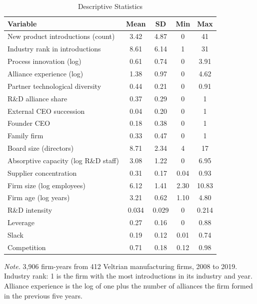 \documentclass[12pt]{article}
\begin{document}
\clearpage
\begin{table}[p]
\centering\small
\caption{Descriptive Statistics}
\begin{tabular}{lcccc}
\toprule
Variable & Mean & SD & Min & Max \\
\midrule
New product introductions (count) & 3.42 & 4.87 & 0 & 41 \\
Industry rank in introductions & 8.61 & 6.14 & 1 & 31 \\
Process innovation (log) & 0.61 & 0.74 & 0 & 3.91 \\
Alliance experience (log) & 1.38 & 0.97 & 0 & 4.62 \\
Partner technological diversity & 0.44 & 0.21 & 0 & 0.91 \\
R\&D alliance share & 0.37 & 0.29 & 0 & 1 \\
External CEO succession & 0.04 & 0.20 & 0 & 1 \\
Founder CEO & 0.18 & 0.38 & 0 & 1 \\
Family firm & 0.33 & 0.47 & 0 & 1 \\
Board size (directors) & 8.71 & 2.34 & 4 & 17 \\
Absorptive capacity (log R\&D staff) & 3.08 & 1.22 & 0 & 6.95 \\
Supplier concentration & 0.31 & 0.17 & 0.04 & 0.93 \\
Firm size (log employees) & 6.12 & 1.41 & 2.30 & 10.83 \\
Firm age (log years) & 3.21 & 0.62 & 1.10 & 4.80 \\
R\&D intensity & 0.034 & 0.029 & 0 & 0.214 \\
Leverage & 0.27 & 0.16 & 0 & 0.88 \\
Slack & 0.19 & 0.12 & 0.01 & 0.74 \\
Competition & 0.71 & 0.18 & 0.12 & 0.98 \\
\bottomrule
\end{tabular}
\begin{minipage}{0.92\textwidth}\footnotesize\smallskip
\textit{Note.} 3,906 firm-years from 412 Veltrian manufacturing firms, 2008 to 2019. Industry rank: 1 is the firm with the most introductions in its industry and year. Alliance experience is the log of one plus the number of alliances the firm formed in the previous five years.
\end{minipage}
\end{table}
\clearpage
\end{document}
